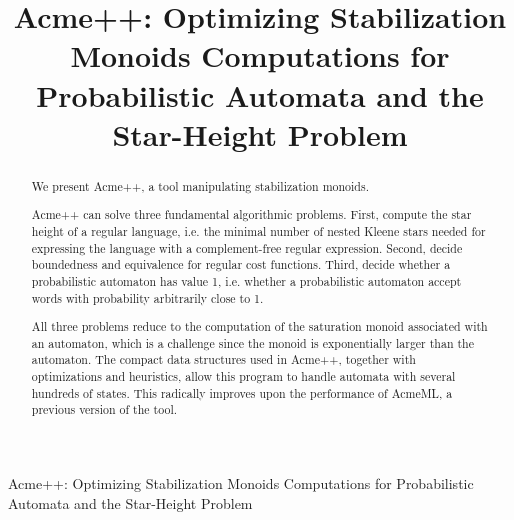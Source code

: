 \documentclass[11pt]{llncs}
\title{Acme++: Optimizing Stabilization Monoids Computations for Probabilistic Automata and the Star-Height Problem}
\begin{document}
\begin{center}
{\large
Acme++: Optimizing Stabilization Monoids Computations for Probabilistic Automata and the Star-Height Problem}
\end{center}

\begin{abstract}
We present Acme++, a tool manipulating stabilization monoids.

Acme++ can solve three fundamental algorithmic problems.  First, compute
the star height of a regular language, i.e. the minimal number of
nested Kleene stars needed for expressing the language with a
complement-free regular expression.  Second, decide boundedness and equivalence for regular cost functions. Third, decide whether a
probabilistic automaton has value 1, i.e. whether a probabilistic
automaton accept words with probability arbitrarily close to 1.

All three problems reduce to the computation of the saturation monoid associated with an automaton,
which is a challenge since the monoid is exponentially larger than the automaton.
The compact data structures used in Acme++, together with optimizations and heuristics, allow this program to handle automata with
several hundreds of states. This radically improves upon the performance of AcmeML,
a previous version of the tool.
\end{abstract}















\end{document}
